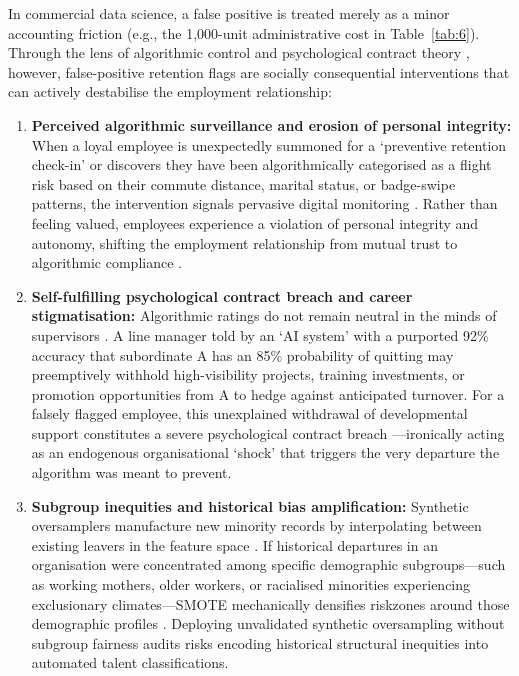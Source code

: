 \documentclass[12pt,a4paper]{article}
\begin{document}
In commercial data science, a false positive is treated merely as a minor accounting friction (e.g., the 1,000-unit administrative cost in Table~\ref{tab:6}). Through the lens of algorithmic control \parencite{ref58} and psychological contract theory \parencite{ref47}, however, false-positive retention flags are socially consequential interventions that can actively destabilise the employment relationship:
\begin{enumerate}
\item \textbf{Perceived algorithmic surveillance and erosion of personal integrity:} When a loyal employee is unexpectedly summoned for a `preventive retention check-in' or discovers they have been algorithmically categorised as a flight risk based on their commute distance, marital status, or badge-swipe patterns, the intervention signals pervasive digital monitoring \parencite{ref61,ref60}. Rather than feeling valued, employees experience a violation of personal integrity and autonomy, shifting the employment relationship from mutual trust to algorithmic compliance \parencite{ref61,ref54}.
\item \textbf{Self-fulfilling psychological contract breach and career stigmatisation:} Algorithmic ratings do not remain neutral in the minds of supervisors \parencite{ref58}. A line manager told by an `AI system' with a purported 92\% accuracy that subordinate A has an 85\% probability of quitting may preemptively withhold high-visibility projects, training investments, or promotion opportunities from A to hedge against anticipated turnover. For a falsely flagged employee, this unexplained withdrawal of developmental support constitutes a severe psychological contract breach \parencite{ref47}---ironically acting as an endogenous organisational `shock' \parencite{ref46} that triggers the very departure the algorithm was meant to prevent.
\item \textbf{Subgroup inequities and historical bias amplification:} Synthetic oversamplers manufacture new minority records by interpolating between existing leavers in the feature space \parencite{ref5}. If historical departures in an organisation were concentrated among specific demographic subgroups---such as working mothers, older workers, or racialised minorities experiencing exclusionary climates---SMOTE mechanically densifies riskzones around those demographic profiles \parencite{ref49,ref53}. Deploying unvalidated synthetic oversampling without subgroup fairness audits risks encoding historical structural inequities into automated talent classifications.
\end{enumerate}
\end{document}
